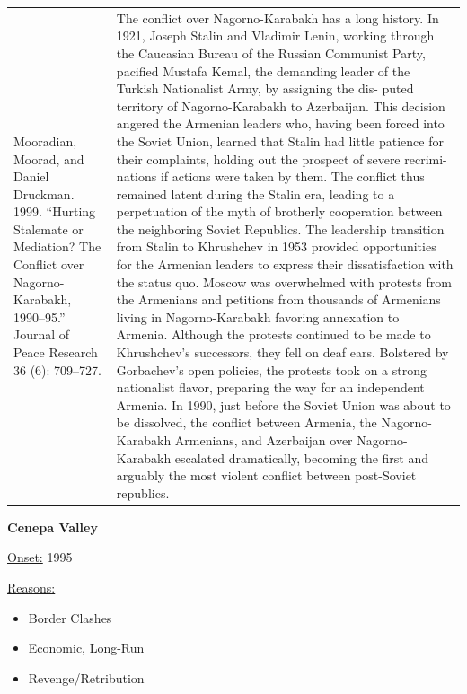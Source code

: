 {\begin{longtable}{p{}p{}}
Mooradian, Moorad, and Daniel Druckman. 1999. “Hurting Stalemate or Mediation? The Conflict over Nagorno-Karabakh, 1990–95.” Journal of Peace Research 36 (6): 709–727. & The conflict over Nagorno-Karabakh has a long history. In 1921, Joseph Stalin and Vladimir Lenin, working through the Caucasian Bureau of the Russian Communist Party, pacified Mustafa Kemal, the demanding leader of the Turkish Nationalist Army, by assigning the dis- puted territory of Nagorno-Karabakh to Azerbaijan. This decision angered the Armenian leaders who, having been forced into the Soviet Union, learned that Stalin had little patience for their complaints, holding out the prospect of severe recrimi- nations if actions were taken by them. The conflict thus remained latent during the Stalin era, leading to a perpetuation of the myth of brotherly cooperation between the neighboring Soviet Republics. The leadership transition from Stalin to Khrushchev in 1953 provided opportunities for the Armenian leaders to express their dissatisfaction with the status quo. Moscow was overwhelmed with protests from the Armenians and petitions from thousands of Armenians living in Nagorno-Karabakh favoring annexation to Armenia. Although the protests continued to be made to Khrushchev's successors, they fell on deaf ears. Bolstered by Gorbachev's open policies, the protests took on a strong nationalist flavor, preparing the way for an independent Armenia. In 1990, just before the Soviet Union was about to be dissolved, the conflict between Armenia, the Nagorno-Karabakh Armenians, and Azerbaijan over Nagorno-Karabakh escalated dramatically, becoming the first and arguably the most violent conflict between post-Soviet republics.
\\
\end{longtable}}
\clearpage
         \textbf{Cenepa Valley} 

          \underline{Onset:} 1995         

\underline{Reasons:}
\begin{itemize}
\item Border Clashes
\item Economic, Long-Run
\item Revenge/Retribution
\end{itemize}

